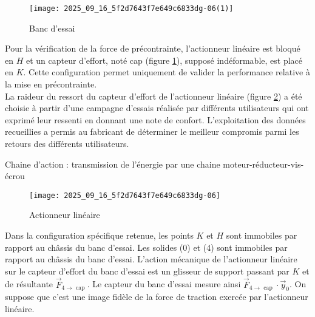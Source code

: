 \begin{figure}[!h]
\centering
\texttt{[image: 2025\_09\_16\_5f2d7643f7e649c6833dg-06(1)]}
\caption{\label{ccs_mp_2023_fig_08}  Banc d'essai}
\end{figure}



Pour la vérification de la force de précontrainte, l'actionneur linéaire est bloqué en $H$ et un capteur d'effort, noté cap (figure \ref{ccs_mp_2023_fig_08}), supposé indéformable, est placé en $K$. Cette configuration permet uniquement de valider la performance relative à la mise en précontrainte.\\
La raideur du ressort du capteur d'effort de l'actionneur linéaire (figure \ref{ccs_mp_2023_fig_09}) a été choisie à partir d'une campagne d'essais réalisée par différents utilisateurs qui ont exprimé leur ressenti en donnant une note de confort. L'exploitation des données recueillies a permis au fabricant de déterminer le meilleur compromis parmi les retours des différents utilisateurs.

Chaine d'action : transmission de l'énergie par une chaine moteur-réducteur-vis-écrou



\begin{figure}[!h]
\centering
\texttt{[image: 2025\_09\_16\_5f2d7643f7e649c6833dg-06]}
\caption{\label{ccs_mp_2023_fig_09} Actionneur linéaire }
\end{figure}


Dans la configuration spécifique retenue, les points $K$ et $H$ sont immobiles par rapport au châssis du banc d'essai. Les solides (0) et (4) sont immobiles par rapport au châssis du banc d'essai. L'action mécanique de l'actionneur linéaire sur le capteur d'effort du banc d'essai est un glisseur de support passant par $K$ et de résultante $\vec{F}_{4 \rightarrow \text { cap }}$. Le capteur du banc d'essai mesure ainsi $\vec{F}_{4 \rightarrow \text { cap }} \cdot \vec{y}_{0}$. On suppose que c'est une image fidèle de la force de traction exercée par l'actionneur linéaire.



